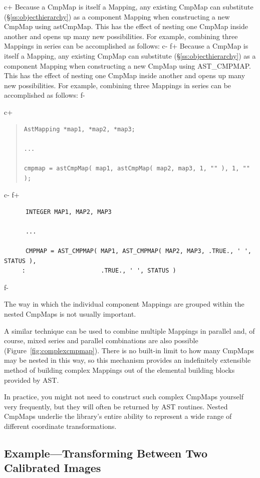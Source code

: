 \documentclass[twoside,11pt]{article}
\newcommand{\secref}[1]{\S\ref{#1}}
\newcommand{\secref}[1]{\ref{#1}}
\begin{document}
c+
Because a CmpMap is itself a Mapping, any existing CmpMap can
substitute (\secref{ss:objecthierarchy}) as a component Mapping when
constructing a new CmpMap using astCmpMap. This has the effect of
nesting one CmpMap inside another and opens up many new possibilities.
For example, combining three Mappings in series can be accomplished as
follows:
c-
f+
Because a CmpMap is itself a Mapping, any existing CmpMap can
substitute (\secref{ss:objecthierarchy}) as a component Mapping when
constructing a new CmpMap using AST\_CMPMAP. This has the effect of
nesting one CmpMap inside another and opens up many new possibilities.
For example, combining three Mappings in series can be accomplished as
follows:
f-

c+
\begin{quote}
\small
\begin{verbatim}
AstMapping *map1, *map2, *map3;

...

cmpmap = astCmpMap( map1, astCmpMap( map2, map3, 1, "" ), 1, "" );
\end{verbatim}
\normalsize
\end{quote}
c-
f+
\small
\begin{verbatim}
      INTEGER MAP1, MAP2, MAP3

      ...

      CMPMAP = AST_CMPMAP( MAP1, AST_CMPMAP( MAP2, MAP3, .TRUE., ' ', STATUS ),
     :                     .TRUE., ' ', STATUS )
\end{verbatim}
\normalsize
f-

The way in which the individual component Mappings are grouped within
the nested CmpMaps is not usually important.

A similar technique can be used to combine multiple Mappings in
parallel and, of course, mixed series and parallel combinations are
also possible (Figure~\ref{fig:complexcmpmap}).  There is no built-in
limit to how many CmpMaps may be nested in this way, so this mechanism
provides an indefinitely extensible method of building complex
Mappings out of the elemental building blocks provided by AST.

In practice, you might not need to construct such complex CmpMaps
yourself very frequently, but they will often be returned by AST
routines.  Nested CmpMaps underlie the library's entire ability to
represent a wide range of different coordinate transformations.

\subsection{\label{ss:cmpmapexample}Example---Transforming Between Two Calibrated Images}
\end{document}
